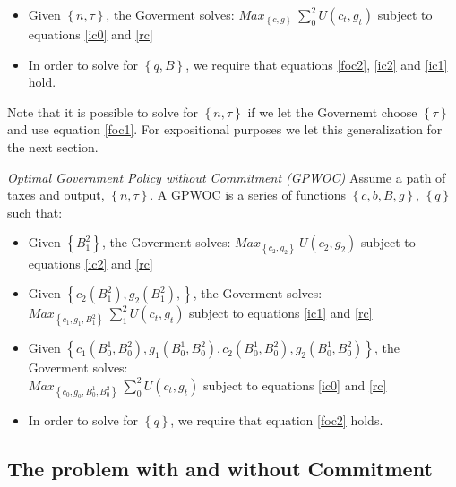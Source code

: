 \documentclass[11pt,letterpaper]{article}
\let\oldsum\sum
\renewcommand{\sum}{\displaystyle\oldsum} %
\begin{document}
\bigskip

\begin{itemize}
  \item Given $\left\{ n,\tau \right\}$, the Goverment solves: $Max_{\left\{ c,g \right\}} \ \sum_{0}^{2}U(c_t,g_t)$ subject to equations \eqref{ic0} and \eqref{rc}
  \item In order to solve for $\left\{ q,B  \right\}$, we require that equations \eqref{foc2}, \eqref{ic2} and \eqref{ic1} hold.
\end{itemize}

\bigskip

Note that it is possible to solve for $ \left\{ n,\tau \right\}$ if we let the Governemt choose $\left\{ \tau \right\}$ and use equation \eqref{foc1}. For expositional purposes we let this generalization for the next section.

\bigskip

\textit{Optimal Government Policy without Commitment (GPWOC)} Assume a path of taxes and output, $\left\{ n,\tau \right\}$. A GPWOC  is a series of functions $\left\{ c,b,B,g \right\}$, $\left\{ q \right\}$ such that:

\bigskip

\begin{itemize}
  \item Given $\left\{ B_1^2 \right\}$, the Goverment solves: $Max_{\left\{ c_2,g_2 \right\}} \ U(c_2,g_2)$ subject to equations \eqref{ic2} and \eqref{rc}
  \item Given $\left\{ c_2(B_1^2), g_2(B_1^2), \right\}$, the Goverment solves: $Max_{\left\{ c_1,g_1,B_1^2 \right\}} \ \sum_{1}^{2}U(c_t,g_t)$ subject to equations \eqref{ic1} and \eqref{rc}
   \item Given $\left\{ c_1(B_0^1,B_0^2), g_1(B_0^1,B_0^2), c_2(B_0^1,B_0^2),g_2(B_0^1,B_0^2) \right\}$, the Goverment solves: \\
   $Max_{\left\{ c_0,g_0,B_0^1,B_0^2 \right\}} \ \sum_{0}^{2}U(c_t,g_t)$ subject to equations \eqref{ic0} and \eqref{rc}
    \item In order to solve for $\left\{ q  \right\}$, we require that equation \eqref{foc2} holds.
\end{itemize}

\bigskip


\subsection*{The problem with and without Commitment}
\end{document}
